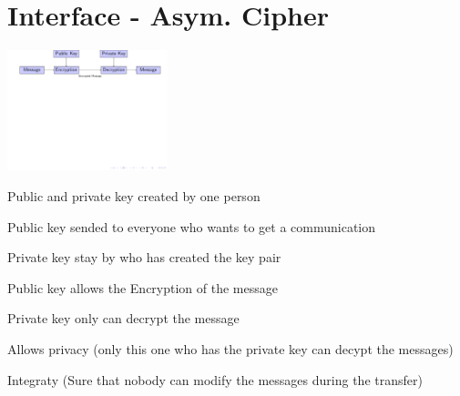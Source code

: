 \section{Interface - Asym. Cipher}

\begin{frame}

\includegraphics[trim=0.5cm 6cm 14cm 0cm, height=3.5cm]{figures/asym_cipher.pdf}


\begin{itemize}
  \small{
  \item Public and private key created by one person
  \item Public key sended to everyone who wants to get a communication
  \item Private key stay by who has created the key pair
  \item Public key allows the Encryption of the message
  \item Private key only can decrypt the message
  \item Allows privacy (only this one who has the private key can decypt the
  messages)
  \item Integraty (Sure that nobody can modify the messages during the
  transfer) }
\end{itemize}



\end{frame}
